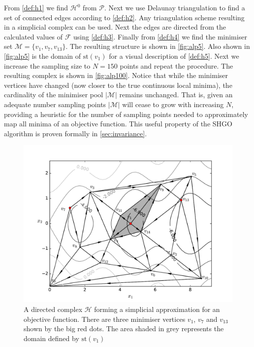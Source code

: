 From \autoref{def:h1} we find $\mathcal{H}^0$ from $\mathcal{P}$. Next we use Delaunay triangulation to find a set of connected edges according to \autoref{def:h2}. Any triangulation scheme resulting in a simplicial complex can be used. Next the edges are directed from the calculated values of $\mathcal{F}$ using \autoref{def:h3}. Finally from \autoref{def:h4} we find the minimiser set $\mathcal{M} = \{v_{1}, v_{7}, v_{13}\}$. The resulting structure is shown in \autoref{fig:alp5}. Also shown in \autoref{fig:alp5} is the domain of $\textrm{st}\left( v_1 \right)$ for a visual description of \autoref{def:h5}. Next we increase the sampling size to $N = 150$ points and repeat the procedure. The resulting complex is shown in \autoref{fig:alp100}. Notice that while the minimiser vertices have changed (now closer to the true continuous local minima), the cardinality of the minimiser pool $|\mathcal{M}|$ remains unchanged. That is, given an adequate number sampling points $|\mathcal{M}|$ will cease to grow with increasing $N$, providing a heuristic for the number of sampling points needed to approximately map all minima of an objective function. This useful property of the SHGO algorithm is proven formally in \autoref{sec:invariance}. 

\begin{figure} 
\centerline{\includegraphics[scale=0.65]{./Fig7.pdf}}
{\caption{A directed complex $\mathcal{H}$ forming a simplicial approximation for an objective function. There are three minimiser vertices $v_1$, $v_7$ and $v_{13}$ shown by the big red dots. The area shaded in grey represents the domain defined by $\textrm{st}\left( v_1 \right)$} \label{fig:alp5}}
\end{figure}

